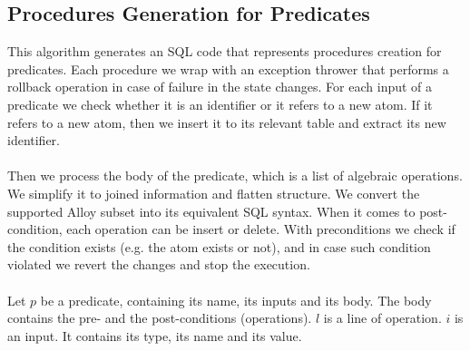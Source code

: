 \documentclass[oneside]{book}
\begin{document}
\subsection{Procedures Generation for Predicates}
This algorithm generates an SQL code that represents procedures creation for predicates. Each procedure we wrap with an exception thrower that performs a rollback operation in case of failure in the state changes. For each input of a predicate we check whether it is an identifier or it refers to a new atom. If it refers to a new atom, then we insert it to its relevant table and extract its new identifier. 
\\\\
Then we process the body of the predicate, which is a list of algebraic operations. We simplify it to joined information and flatten structure. We convert the supported Alloy subset into its equivalent SQL syntax. When it comes to post-condition, each operation can be insert or delete. With preconditions we check if the condition exists (e.g. the atom exists or not), and in case such condition violated we revert the changes and stop the execution. 
\\\\
Let $p$ be a predicate, containing its name, its inputs and its body. The body contains the pre- and the post-conditions (operations). $l$ is a line of operation. $i$ is an input. It contains its type, its name and its value.\\
\end{document}
